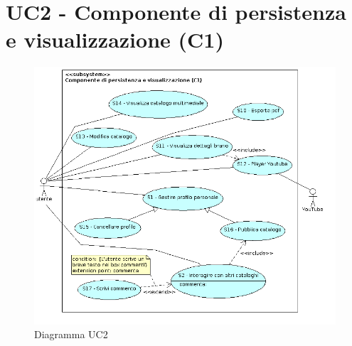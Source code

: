 \section{UC2 - Componente di persistenza e visualizzazione (C1)}
\begin{figure}[h]
  \centering
  \includegraphics[width=16cm]{img/AR/UC2.png}
\caption{Diagramma UC2}
\end{figure}

